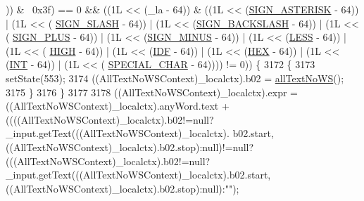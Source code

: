 \begin{DoxyCode}
      )) & ~0x3f) == 0 && ((1L << (\_la - 64)) & ((1L << (\hyperlink{classgov_1_1nasa_1_1jpf_1_1inspector_1_1client_1_1parser_1_1_console_grammar_parser_ad92bebb0c2308d9422bf40bd757fa623}{SIGN\_ASTERISK} - 64)) | (1L << (
      \hyperlink{classgov_1_1nasa_1_1jpf_1_1inspector_1_1client_1_1parser_1_1_console_grammar_parser_a4048b83fec020550f08eb7f44df0a486}{SIGN\_SLASH} - 64)) | (1L << (\hyperlink{classgov_1_1nasa_1_1jpf_1_1inspector_1_1client_1_1parser_1_1_console_grammar_parser_ad9ff891626d90dc1ee921de2a2335399}{SIGN\_BACKSLASH} - 64)) | (1L << (
      \hyperlink{classgov_1_1nasa_1_1jpf_1_1inspector_1_1client_1_1parser_1_1_console_grammar_parser_ac2a6ae73b3b6ce7feef07c1b4866af05}{SIGN\_PLUS} - 64)) | (1L << (\hyperlink{classgov_1_1nasa_1_1jpf_1_1inspector_1_1client_1_1parser_1_1_console_grammar_parser_a48b3f6921fee5d663dafe240074dac66}{SIGN\_MINUS} - 64)) | (1L << (\hyperlink{classgov_1_1nasa_1_1jpf_1_1inspector_1_1client_1_1parser_1_1_console_grammar_parser_ac325745c393b7e613626f2c93e95e486}{LESS} - 64)) | (1L << (
      \hyperlink{classgov_1_1nasa_1_1jpf_1_1inspector_1_1client_1_1parser_1_1_console_grammar_parser_a49ebb9abbff306598870ca6253d0fc4f}{HIGH} - 64)) | (1L << (\hyperlink{classgov_1_1nasa_1_1jpf_1_1inspector_1_1client_1_1parser_1_1_console_grammar_parser_ae9d41d0f0abda3e06c7f452164d2e3a0}{IDF} - 64)) | (1L << (\hyperlink{classgov_1_1nasa_1_1jpf_1_1inspector_1_1client_1_1parser_1_1_console_grammar_parser_a760e1cd3b643e8ee8af5d134b5d438c6}{HEX} - 64)) | (1L << (\hyperlink{classgov_1_1nasa_1_1jpf_1_1inspector_1_1client_1_1parser_1_1_console_grammar_parser_abd77a1befc3eca91ef4ffb5856126df5}{INT} - 64)) | (1L << (
      \hyperlink{classgov_1_1nasa_1_1jpf_1_1inspector_1_1client_1_1parser_1_1_console_grammar_parser_a978bd8334dd75839036a09d94b04280f}{SPECIAL\_CHAR} - 64)))) != 0)) \{
3172           \{
3173           setState(553);
3174           ((AllTextNoWSContext)\_localctx).b02 = \hyperlink{classgov_1_1nasa_1_1jpf_1_1inspector_1_1client_1_1parser_1_1_console_grammar_parser_ac1f61b1a3d9917fc0f0920f3274d5b22}{allTextNoWS}();
3175           \}
3176         \}
3177 
3178          ((AllTextNoWSContext)\_localctx).expr =  ((AllTextNoWSContext)\_localctx).anyWord.text +            
                      ((((AllTextNoWSContext)\_localctx).b02!=null?\_input.getText(((AllTextNoWSContext)\_localctx).
      b02.start,((AllTextNoWSContext)\_localctx).b02.stop):null)!=null?(((AllTextNoWSContext)\_localctx).b02!=null?
      \_input.getText(((AllTextNoWSContext)\_localctx).b02.start,((AllTextNoWSContext)\_localctx).b02.stop):null):\textcolor{stringliteral}{""}); 

\end{DoxyCode}
